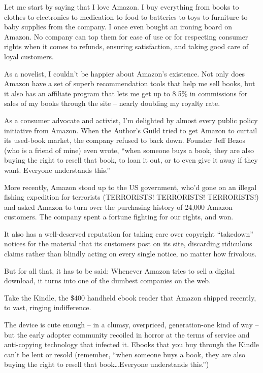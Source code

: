 Let me start by saying that I love Amazon. I buy everything from
books to clothes to electronics to medication to food to batteries
to toys to furniture to baby supplies from the company. I once even
bought an ironing board on Amazon. No company can top them for ease
of use or for respecting consumer rights when it comes to refunds,
ensuring satisfaction, and taking good care of loyal customers.

As a novelist, I couldn't be happier about Amazon's existence. Not
only does Amazon have a set of superb recommendation tools that
help me sell books, but it also has an affiliate program that lets
me get up to 8.5\% in commissions for sales of my books through the
site -- nearly doubling my royalty rate.

As a consumer advocate and activist, I'm delighted by almost every
public policy initiative from Amazon. When the Author's Guild tried
to get Amazon to curtail its used-book market, the company refused
to back down. Founder Jeff Bezos (who is a friend of mine) even
wrote, ``when someone buys a book, they are also buying the right to
resell that book, to loan it out, or to even give it away if they
want. Everyone understands this.''

More recently, Amazon stood up to the US government, who'd gone on
an illegal fishing expedition for terrorists (TERRORISTS!
TERRORISTS! TERRORISTS!) and asked Amazon to turn over the
purchasing history of 24,000 Amazon customers. The company spent a
fortune fighting for our rights, and won.

It also has a well-deserved reputation for taking care over
copyright ``takedown'' notices for the material that its customers
post on its site, discarding ridiculous claims rather than blindly
acting on every single notice, no matter how frivolous.

But for all that, it has to be said: Whenever Amazon tries to sell
a digital download, it turns into one of the dumbest companies on
the web.

Take the Kindle, the \$400 handheld ebook reader that Amazon
shipped recently, to vast, ringing indifference.

The device is cute enough -- in a clumsy, overpriced, generation-one
kind of way -- but the early adopter community recoiled in horror at
the terms of service and anti-copying technology that infected it.
Ebooks that you buy through the Kindle can't be lent or resold
(remember, ``when someone buys a book, they are also buying the
right to resell that book\ldots{}Everyone understands this.'')

